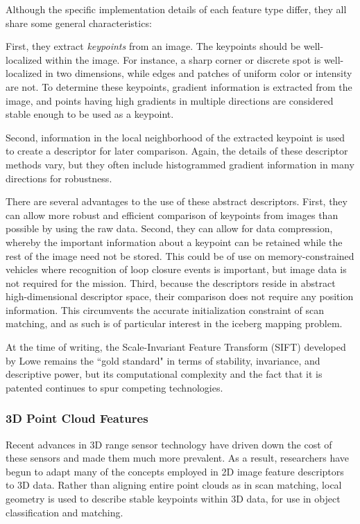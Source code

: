 Although the specific implementation details of each feature type differ, they all share some general characteristics:

First, they extract \emph{keypoints} from an image. The keypoints should be well-localized within the image. For instance, a sharp corner or discrete spot is well-localized in two dimensions, while edges and patches of uniform color or intensity are not. To determine these keypoints, gradient information is extracted from the image, and points having high gradients in multiple directions are considered stable enough to be used as a keypoint. 

Second, information in the local neighborhood of the extracted keypoint is used to create a descriptor for later comparison. Again, the details of these descriptor methods vary, but they often include histogrammed gradient information in many directions for robustness. 

There are several advantages to the use of these abstract descriptors. First, they can allow more robust and efficient comparison of keypoints from images than possible by using the raw data. Second, they can allow for data compression, whereby the important information about a keypoint can be retained while the rest of the image need not be stored. This could be of use on memory-constrained vehicles where recognition of loop closure events is important, but image data is not required for the mission. Third, because the descriptors reside in abstract high-dimensional descriptor space, their comparison does not require any position information. This circumvents the accurate initialization constraint of scan matching, and as such is of particular interest in the iceberg mapping problem.

At the time of writing, the Scale-Invariant Feature Transform (SIFT) developed by Lowe \cite{Lowe} remains the ``gold standard" in terms of stability, invariance, and descriptive power, but its computational complexity and the fact that it is patented continues to spur competing technologies. \cite{challengers}

\subsubsection{3D Point Cloud Features}

Recent advances in 3D range sensor technology have driven down the cost of these sensors and made them much more prevalent. As a result, researchers have begun to adapt many of the concepts employed in 2D image feature descriptors to 3D data. Rather than aligning entire point clouds as in scan matching, local geometry is used to describe stable keypoints within 3D data, for use in object classification and matching. 

